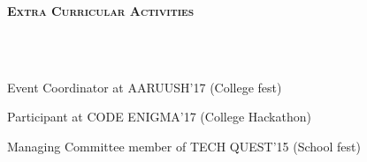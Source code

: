 \documentclass{article}
\newcommand\blfootnote[1]{%
  \begingroup
  \renewcommand\thefootnote{}\footnote{#1}%
  \addtocounter{footnote}{-1}%
  \endgroup
}
\newcommand{\header}[1]{{
\hspace*{-15pt}\vspace*{6pt} \textsc{#1}} \vspace*{-6pt} 
\lineunder
}
\newcommand{\lineunder}{
\vspace*{-8pt} \\ \hspace*{-18pt} 
\hrulefill \\
}
\renewcommand{\labelitemii}{
$\vcenter{\hbox{\tiny$\bullet$}}$\hspace*{-3pt}
}
\newenvironment{bullet-list-major}{
\begin{list}{\labelitemii}{\setlength\leftmargin{3pt} 
\topsep 0pt \itemsep -2pt}}{\vspace*{4pt}\end{list}
}
\begin{document}
\vspace*{6pt}%
\header{\textbf{Extra Curricular Activities}}
    \begin{bullet-list-major}
    \item  Event Coordinator at AARUUSH'17 (College fest) 
    \vspace{2pt}
    \item  Participant at CODE ENIGMA'17 (College Hackathon) 
    \vspace{2pt}
    \item  Managing Committee member of TECH QUEST'15 (School fest)
    \end{bullet-list-major}
\end{document}

